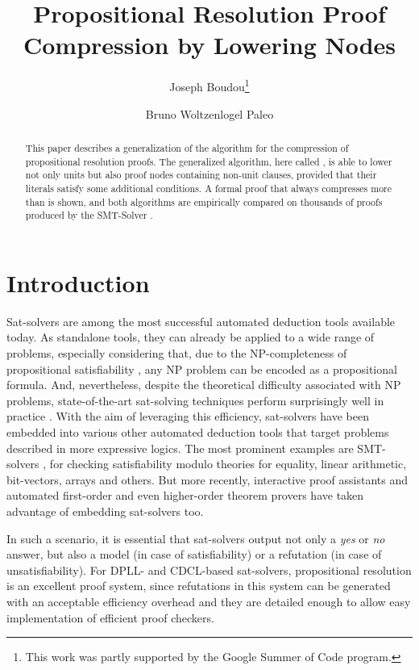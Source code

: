 \documentclass{llncs}
\title{Propositional Resolution Proof Compression by Lowering Nodes}
\author{
  Joseph Boudou\inst{1}\thanks{This work was partly supported by the Google Summer of Code program.}
  \and 
  Bruno Woltzenlogel Paleo\inst{2}
}
\institute{
  Universit\'e Paul Sabatier, Toulouse \\
  \email{joseph.boudou@matabio.net}
  \and 
  Vienna University of Technology \\
  \email{bruno@logic.at}
}
\begin{document}
\maketitle


\begin{abstract}
This paper describes a generalization of the {\LowerUnits} algorithm \cite{LURPI} for the compression
of propositional resolution proofs. The generalized algorithm, here called {\LowerUnivalents}, is
able to lower not only units but also proof nodes containing non-unit clauses, provided that their
literals satisfy some additional conditions. A formal proof that {\LowerUnivalents} always
compresses more than {\LowerUnits} is shown, and both algorithms are empirically compared on
thousands of proofs produced by the SMT-Solver \veriT.
\end{abstract}

\section{Introduction}

Sat-solvers are among the most successful automated deduction tools available today. As standalone tools, they can already be applied to a wide range of problems, especially considering that, due to the NP-completeness of propositional satisfiability \cite{cook}, any NP problem can be encoded as a propositional formula. And, nevertheless, despite the theoretical difficulty associated with NP problems, state-of-the-art sat-solving techniques perform surprisingly well in practice \cite{sat-competition}. With the aim of leveraging this efficiency, sat-solvers have been embedded into various other automated deduction tools that target problems described in more expressive logics. The most prominent examples are SMT-solvers \cite{veriT}, for checking satisfiability modulo theories for equality, linear arithmetic, bit-vectors, arrays and others. But more recently, interactive proof assistants \cite{isabelle-blanchette-boehme} and automated first-order \cite{spassT?MELIA?iProver?Vampire?} and even higher-order \cite{satallax} theorem provers have taken advantage of embedding sat-solvers too.

In such a scenario, it is essential that sat-solvers output not only a \emph{yes} or \emph{no} answer, but also a model (in case of satisfiability) or a refutation (in case of unsatisfiability). For DPLL- and CDCL-based sat-solvers, propositional resolution is an excellent proof system, since refutations in this system can be generated with an acceptable efficiency overhead and they are detailed enough to allow easy implementation of efficient proof checkers.
\end{document}
